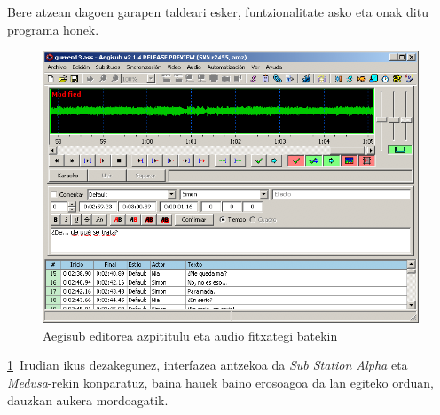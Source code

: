 Bere atzean dagoen garapen taldeari esker, funtzionalitate asko eta onak ditu programa honek.

\begin{figure}[htbp]
\begin{center}
\includegraphics[width=\columnwidth, natwidth=725pt, natheight=525pt]{Pictures/Chapter2/aegisub-audio.png}
\caption{Aegisub editorea azpititulu eta audio fitxategi batekin}
\label{aegisub-audio}
\end{center}
\end{figure}

\ref{aegisub-audio}~Irudian ikus dezakegunez, interfazea antzekoa da \textit{Sub Station Alpha} eta \textit{Medusa}-rekin konparatuz, baina hauek baino erosoagoa da lan egiteko orduan, dauzkan aukera mordoagatik.

